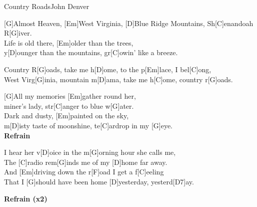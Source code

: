 \begin{song}{Country Roads}{John Denver}
    \begin{guitarMagic}

        [G]Almost Heaven, [Em]West Virginia,
        [D]Blue Ridge Mountains, Sh[C]enandoah R[G]iver. \\
        [G]Life is old there, [Em]older than the trees, \\
        y[D]ounger than the mountains, gr[C]owin' like a breeze.

        \begin{chorus}
            Country R[G]oads, take me h[D]ome, 
            to the p[Em]lace, I bel[C]ong, \\
            West Virg[G]inia, mountain m[D]ama, 
            take me h[C]ome, country r[G]oads.
        \end{chorus}

        [G]All my memories [Em]gather round her, \\
        [D]miner's lady, str[C]anger to blue w[G]ater. \\
        [G]Dark and dusty, [Em]painted on the sky, \\
        m[D]isty taste of moonshine, te[C]ardrop in my [G]eye. \\

        \textbf{Refrain}

        \begin{bridge}
            [Em]I hear her v[D]oice in the m[G]orning hour she calls me, \\
            The [C]radio rem[G]inds me of my [D]home far away. \\
            And [Em]driving down the r[F]oad I get a f[C]eeling \\
            That I [G]should have been home [D]yesterday, yesterd[D7]ay.
        \end{bridge}

        \textbf{Refrain (x2)}

    \end{guitarMagic}
\end{song}
